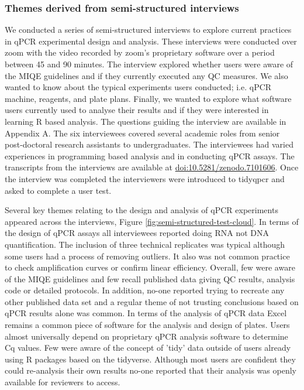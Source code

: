 \documentclass[../main.tex]{subfiles}
\begin{document}
\subsubsection{Themes derived from semi-structured interviews}

We conducted a series of semi-structured interviews to explore current practices in qPCR experimental design and analysis.
These interviews were conducted over zoom with the video recorded by zoom's proprietary software over a period between 45 and 90 minutes.
The interview explored whether users were aware of the MIQE guidelines and if they currently executed any QC measures. 
We also wanted to know about the typical experiments users conducted; i.e. qPCR machine, reagents, and plate plans. 
Finally, we wanted to explore what software users currently used to analyse their results and if they were interested in learning R based analysis. 
The questions guiding the interview are available in Appendix A.
The six interviewees covered several academic roles from senior post-doctoral research assistants to undergraduates.
The interviewees had varied experiences in programming based analysis and in conducting qPCR assays.
The transcripts from the interviews are available at \href{https://doi.org/10.5281/zenodo.7101606}{doi:10.5281/zenodo.7101606}.
Once the interview was completed the interviewers were introduced to tidyqpcr and asked to complete a user test.

Several key themes relating to the design and analysis of qPCR experiments appeared across the interviews, Figure \ref{fig:semi-structured-test-cloud}.
In terms of the design of qPCR assays all interviewees reported doing RNA not DNA quantification.
The inclusion of three technical replicates was typical although some users had a process of removing outliers.
It also was not common practice to check amplification curves or confirm linear efficiency.
Overall, few were aware of the MIQE guidelines and few recall published data giving QC results, analysis code or detailed protocols.
In addition, no-one reported trying to recreate any other published data set and a regular theme of not trusting conclusions based on qPCR results alone was common.
In terms of the analysis of qPCR data Excel remains a common piece of software for the analysis and design of plates.
Users almost universally depend on proprietary qPCR analysis software to determine Cq values.
Few were aware of the concept of 'tidy' data outside of users already using R packages  based on the tidyverse.
Although most users are confident they could re-analysis their own results no-one reported that their analysis was openly available for reviewers to access.
\end{document}
